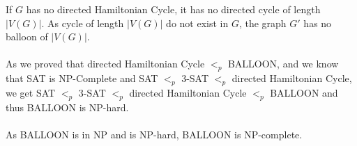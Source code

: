 \documentclass[11pt]{article}
\begin{document}
\begin{itemize}
	If $G$ has no directed Hamiltonian Cycle, it has no directed cycle of length $|V(G)|$. As cycle of length $|V(G)|$ do not exist in $G$, the graph $G'$ has no balloon of $|V(G)|$.\\ \\ 
	As we proved that directed Hamiltonian Cycle $<_p$ BALLOON, and we know that  SAT is NP-Complete and SAT $<_p$ 3-SAT $<_p$ directed Hamiltonian Cycle, we get SAT $<_p$ 3-SAT $<_p$ directed Hamiltonian Cycle $<_p$ BALLOON and thus BALLOON is NP-hard.\\ \\ 
	As BALLOON is in NP and is NP-hard, BALLOON is NP-complete.
\end{itemize}
\end{document}
